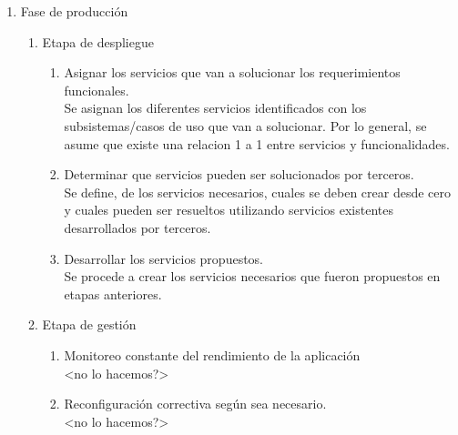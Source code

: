\begin{enumerate}
\item Fase de producción
\begin{enumerate}
  \item 	Etapa de despliegue
		\begin{enumerate}
		  \item Asignar los servicios que van a solucionar los requerimientos funcionales. \\
			Se asignan los diferentes servicios identificados con los subsistemas/casos de uso que van a solucionar. Por lo general, se asume que existe una relacion 1 a 1 entre servicios y funcionalidades.
		\item Determinar que servicios pueden ser solucionados por terceros. \\
			Se define, de los servicios necesarios, cuales se deben crear desde cero y cuales pueden ser resueltos utilizando servicios existentes desarrollados por terceros.
		\item Desarrollar los servicios propuestos. \\
			Se procede a crear los servicios necesarios que fueron propuestos en etapas anteriores.
		\end{enumerate}
	\item Etapa de gestión
		\begin{enumerate}
		  \item Monitoreo constante del rendimiento de la aplicación \\
			<no lo hacemos?>
		 \item Reconfiguración correctiva según sea necesario. \\
			<no lo hacemos?>
		\end{enumerate}
\end{enumerate}
\end{enumerate}
